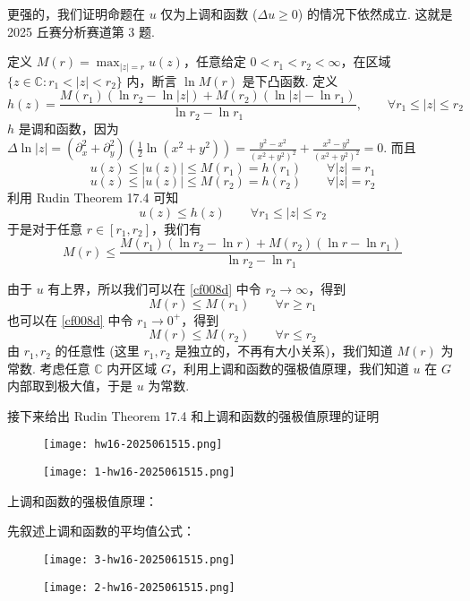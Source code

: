 更强的，我们证明命题在 $u$ 仅为上调和函数 ($\Delta u\geq0$) 的情况下依然成立. 这就是 2025 丘赛分析赛道第 3 题.

定义 $M(r)=\max_{\lvert z \rvert=r}u(z)$，任意给定 $0<r_1<r_2<\infty$，在区域 $\{ z\in \mathbb{C}:r_1<\lvert z \rvert<r_2 \}$ 内，断言 $\ln M(r)$ 是下凸函数. 定义
\[
h(z)=\frac{M(r_1)(\ln r_2-\ln \lvert z \rvert )+M(r_2)(\ln \lvert z \rvert -\ln r_1)}{\ln r_2-\ln r_1},\qquad \forall r_1\leq \lvert z \rvert \leq r_2
\]
$h$ 是调和函数，因为 $\Delta \ln \lvert z \rvert=(\partial_{x}^{2}+\partial_{y}^{2})\left( \frac{1}{2}\ln(x^{2}+y^{2}) \right)=\frac{y^{2}-x^{2}}{(x^{2}+y^{2})^{2}}+\frac{x^{2}-y^{2}}{(x^{2}+y^{2})^{2}}=0$. 而且
\[
u(z)\leq \lvert u(z) \rvert \leq M(r_1)=h(r_1)\qquad \forall \lvert z \rvert =r_1
\]
\[
u(z)\leq \lvert u(z) \rvert \leq M(r_2)=h(r_2)\qquad \forall \lvert z \rvert =r_2
\]
利用 Rudin Theorem 17.4 可知
\[
u(z)\leq h(z)\qquad \forall r_1\leq \lvert z \rvert \leq r_2
\]
于是对于任意 $r\in[r_1,r_2]$，我们有
\begin{equation}
M(r)\leq \frac{M(r_1)(\ln r_2-\ln r )+M(r_2)(\ln r -\ln r_1)}{\ln r_2-\ln r_1}
\label{cf008d}
\end{equation}

由于 $u$ 有上界，所以我们可以在 \cref{cf008d} 中令 $r_2\to \infty$，得到
\[
M(r)\leq M(r_1)\qquad \forall r\geq r_1
\]
也可以在 \cref{cf008d} 中令 $r_1\to0^{+}$，得到
\[
M(r)\leq M(r_2)\qquad \forall r\leq r_2
\]
由 $r_1,r_2$ 的任意性 (这里 $r_1,r_2$ 是独立的，不再有大小关系)，我们知道 $M(r)$ 为常数. 考虑任意 $\mathbb{C}$ 内开区域 $G$，利用上调和函数的强极值原理，我们知道 $u$ 在 $G$ 内部取到极大值，于是 $u$ 为常数.

接下来给出 Rudin Theorem 17.4 和上调和函数的强极值原理的证明

\begin{figure}[H]
\centering
\texttt{[image: hw16-2025061515.png]}
\label{}
\end{figure}
\begin{figure}[H]
\centering
\texttt{[image: 1-hw16-2025061515.png]}
\label{}
\end{figure}

上调和函数的强极值原理：

先叙述上调和函数的平均值公式：
\begin{figure}[H]
\centering
\texttt{[image: 3-hw16-2025061515.png]}
\label{}
\end{figure}

\begin{figure}[H]
\centering
\texttt{[image: 2-hw16-2025061515.png]}
\label{}
\end{figure}

